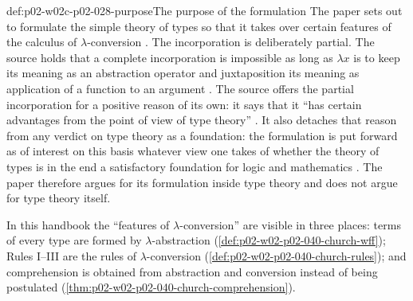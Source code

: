 \begin{hbconvention}{def:p02-w02c-p02-028-purpose}{The purpose of the formulation}
The paper sets out to formulate the simple theory of types so that it takes
over certain features of the calculus of \(\lambda\)-conversion
\cite[p.~56]{Church1940}.  The incorporation is deliberately partial.  The
source holds that a complete incorporation is impossible as long as
\(\lambda x\) is to keep its meaning as an abstraction operator and
juxtaposition its meaning as application of a function to an argument
\cite[p.~56]{Church1940}.  The source offers the partial incorporation for
a positive reason of its own: it says that it ``has certain advantages from
the point of view of type theory'' \cite[p.~56]{Church1940}.  It also
detaches that reason from any verdict on type theory as a foundation: the
formulation is put forward as of interest on this basis whatever view one
takes of whether the theory of types is in the end a satisfactory
foundation for logic and mathematics \cite[p.~56]{Church1940}.  The paper
therefore argues for its formulation inside type theory and does not argue
for type theory itself.

In this handbook the ``features of \(\lambda\)-conversion'' are visible in
three places: terms of every type are formed by \(\lambda\)-abstraction
(\cref{def:p02-w02-p02-040-church-wff}); Rules I--III are the rules of
\(\lambda\)-conversion (\cref{def:p02-w02-p02-040-church-rules}); and
comprehension is obtained from abstraction and conversion instead of being
postulated (\cref{thm:p02-w02-p02-040-church-comprehension}).
\end{hbconvention}

